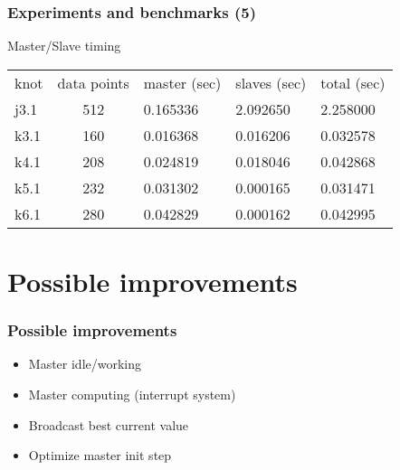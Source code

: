 \documentclass{beamer}
\begin{document}
\begin{frame}
\frametitle{Experiments and benchmarks (5)}
Master/Slave timing \\[1cm]
\begin{tabular}{lclll}
knot & data points & master (sec) & slaves (sec) & total (sec) \\
j3.1 & 512 & 0.165336 & 2.092650 & 2.258000 \\
k3.1 & 160 & 0.016368 & 0.016206 & 0.032578 \\
k4.1 & 208 & 0.024819 & 0.018046 & 0.042868 \\
k5.1 & 232 & 0.031302 & 0.000165 & 0.031471 \\
k6.1 & 280 & 0.042829 & 0.000162 & 0.042995 \\
\end{tabular}
\end{frame}

\section{Possible improvements}

\begin{frame}
\frametitle{Possible improvements}
\begin{itemize}
\item<1-> Master idle/working
\item<2-> Master computing (interrupt system)
\item<3-> Broadcast best current value
\item<4-> Optimize master init step
\end{itemize}
\end{frame}
\end{document}
